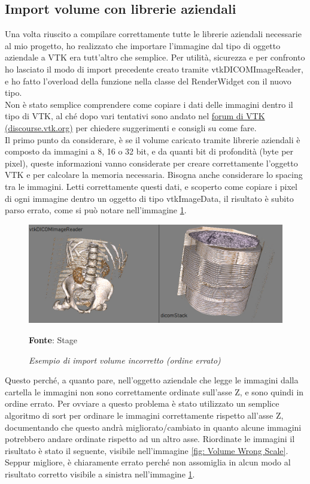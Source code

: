 \subsection{Import volume con librerie aziendali}
Una volta riuscito a compilare correttamente tutte le librerie aziendali necessarie al mio progetto, ho realizzato che importare l'immagine dal tipo di oggetto aziendale a VTK era tutt'altro che semplice. Per utilità, sicurezza e per confronto ho lasciato il modo di import precedente creato tramite vtkDICOMImageReader, e ho fatto l'overload della funzione nella classe del RenderWidget con il nuovo tipo.
\\
Non è stato semplice comprendere come copiare i dati delle immagini dentro il tipo di VTK, al ché dopo vari tentativi sono andato nel \href{https://discourse.vtk.org/t/trying-to-load-custom-loaded-images-into-vtkimageimport/3704}{forum di VTK (discourse.vtk.org)} per chiedere suggerimenti e consigli su come fare.
\\
Il primo punto da considerare, è se il volume caricato tramite librerie aziendali è composto da immagini a 8, 16 o 32 bit, e da quanti bit di profondità (byte per pixel), queste informazioni vanno considerate per creare correttamente l'oggetto VTK e per calcolare la memoria necessaria. Bisogna anche considerare lo spacing tra le immagini. Letti correttamente questi dati, e scoperto come copiare i pixel di ogni immagine dentro un oggetto di tipo vtkImageData, il risultato è subito parso errato, come si può notare nell'immagine \ref{fig: Volume Wrong Order}.

\begin{figure}[h]
    \centering
    \includegraphics[width=1\textwidth]{immagini/svolgimento/volumebrokenorder.jpg}
    \caption{\textit{Esempio di import volume incorretto (ordine errato)}}
    \textbf{Fonte}: Stage
    \label{fig: Volume Wrong Order}
\end{figure}

Questo perché, a quanto pare, nell'oggetto aziendale che legge le immagini dalla cartella le immagini non sono correttamente ordinate sull'asse Z, e sono quindi in ordine errato. Per ovviare a questo problema è stato utilizzato un semplice algoritmo di sort per ordinare le immagini correttamente rispetto all'asse Z, documentando che questo andrà migliorato/cambiato in quanto alcune immagini potrebbero andare ordinate rispetto ad un altro asse. Riordinate le immagini il risultato è stato il seguente, visibile nell'immagine \ref{fig: Volume Wrong Scale}. Seppur migliore, è chiaramente errato perché non assomiglia in alcun modo al risultato corretto visibile a sinistra nell'immagine \ref{fig: Volume Wrong Order}.

